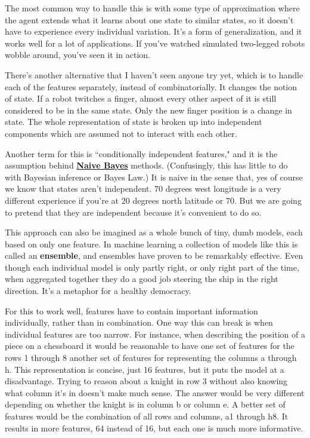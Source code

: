 The most common way to handle this is with some type of approximation
where the agent extends what it learns about one state to similar states,
so it doesn't have to experience every individual variation.
It's a form of generalization, and it works well for a lot of applications.
If you've watched simulated two-legged robots wobble around,
you've seen it in action.

There's another alternative that I haven't seen anyone try yet,
which is to handle each of the features separately, instead of combinatorially.
It changes the notion of state. If a robot twitches a finger, almost every
other aspect of it is still considered to be in the same state.
Only the new finger position is a change in state. The whole representation
of state is broken up into independent components which are assumed
not to interact with each other.

Another term for this is ``conditionally independent features," and it is
the assumption behind
\textbf{\href{https://en.wikipedia.org/wiki/Naive_Bayes_classifier}{Naive Bayes}}
methods. (Confusingly, this has little to do with Bayesian inference or
Bayes Law.) It is naive in the sense that, yes of course we know that
states aren't independent. 70 degrees west longitude is a very different
experience if you're at 20 degrees north latitude or 70. But we are going
to pretend that they are independent because it's convenient to do so.

This approach can also be imagined as a whole bunch of tiny, dumb models,
each based on only one feature. In machine learning a collection of models
like this is called an \textbf{ensemble}, and ensembles have proven to be
remarkably effective. Even though each individual model is only partly right,
or only right part of the time, when aggregated together they do a good
job steering the ship in the right direction. It's a metaphor
for a healthy democracy.

For this to work well, features have to contain important information
individually, rather than in combination. One way this can break is when
individual features are too narrow. For instance, when describing the
position of a piece on a chessboard it would be reasonable to have one set
of features for the rows 1 through 8 another set of features for representing
the columns a through h. This representation is concise, just 16 features,
but it puts the model at a disadvantage. Trying to reason about a knight
in row 3 without also knowing what column it's in doesn't make much sense.
The answer would be very different depending on whether the knight is in
column b or column e. A better set of features would be the combination
of all rows and columns, a1 through h8. It results in more features,
64 instead of 16, but each one is much more informative.

